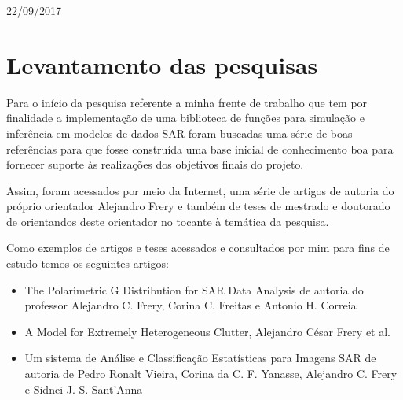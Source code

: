 \begin{titlepage}

{\large 22/09/2017}\\[2cm] %


 

\vfill %

\end{titlepage}


\section{Levantamento das pesquisas}

Para o início da pesquisa referente a minha frente de trabalho que tem por finalidade a implementação de uma biblioteca de funções para simulação e inferência em modelos de dados SAR foram buscadas uma série de boas referências para que fosse construída uma base inicial de conhecimento boa para fornecer suporte às realizações dos objetivos finais do projeto.

Assim, foram acessados por meio da Internet, uma série de artigos de autoria do próprio orientador Alejandro Frery e também de teses de mestrado e doutorado de orientandos deste orientador no tocante à temática da pesquisa. 

Como exemplos de artigos e teses acessados e consultados por mim para fins de estudo temos os seguintes artigos:

\begin{itemize}
	\item The Polarimetric G Distribution for SAR Data Analysis de autoria do professor Alejandro C. Frery, Corina C. Freitas e Antonio H. Correia
    \item A Model for Extremely Heterogeneous Clutter, Alejandro César Frery et al.
    \item Um sistema de Análise e Classificação Estatísticas para Imagens SAR de autoria de Pedro Ronalt Vieira, Corina da C. F. Yanasse, Alejandro C. Frery e Sidnei J. S. Sant’Anna 
\end{itemize}

